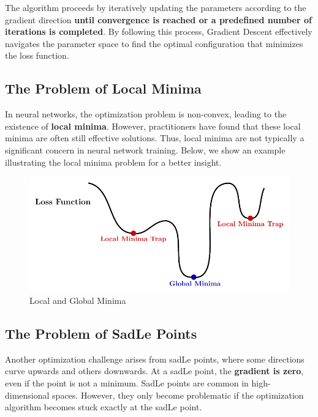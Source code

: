 The algorithm proceeds by iteratively updating the parameters according to the gradient direction \textbf{until convergence is reached or a predefined number of iterations is completed}. By following this process, Gradient Descent effectively navigates the parameter space to find the optimal configuration that minimizes the loss function.


\subsection{The Problem of Local Minima}

In neural networks, the optimization problem is non-convex, leading to the existence of \textbf{local minima}. However, practitioners have found that these local minima are often still effective solutions. Thus, local minima are not typically a significant concern in neural network training. Below, we show an example illustrating the local minima problem for a better insight.

\begin{figure}[!htbp]
    \centering
    \includegraphics[scale=0.9]{tikz/chapter2 - Local Minima.pdf}
    \caption{Local and Global Minima}
\end{figure}

\subsection{The Problem of Sad\partial Le Points}

Another optimization challenge arises from sad\partial Le points, where some directions curve upwards and others downwards. At a sad\partial Le point, the \textbf{gradient is zero}, even if the point is not a minimum. Sad\partial Le points are common in high-dimensional spaces. However, they only become problematic if the optimization algorithm becomes stuck exactly at the sad\partial Le point.

